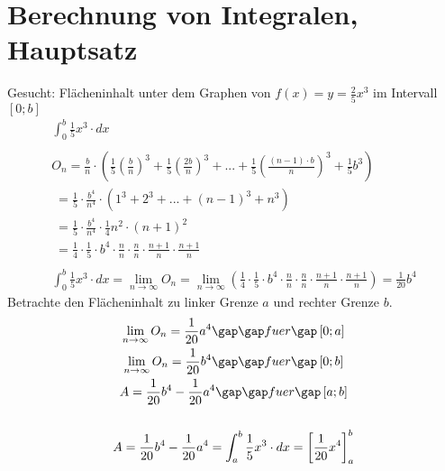 \section{Berechnung von Integralen, Hauptsatz}
Gesucht: Flächeninhalt unter dem Graphen von $f(x) = y = \frac{2}{5}x^3$ im Intervall $\left[0; b\right]$ \\
\begin{gather*}
  \int_0^b \frac{1}{5}x^3 \cdot dx \\\\
  O_n = \frac{b}{n} \cdot (\frac{1}{5}(\frac{b}{n})^3 + \frac{1}{5}(\frac{2b}{n})^3 + ... + \frac{1}{5}(\frac{(n - 1) \cdot b}{n})^3 + \frac{1}{5}b^3) \\
  \;= \frac{1}{5} \cdot \frac{b^4}{n^4} \cdot (1^3 + 2^3 + ... + (n - 1)^3 + n^3) \\
  \;= \frac{1}{5} \cdot \frac{b^4}{n^4} \cdot \frac{1}{4}n^2 \cdot (n + 1)^2 \\
  \;= \frac{1}{4} \cdot \frac{1}{5} \cdot b^4 \cdot \frac{n}{n} \cdot \frac{n}{n} \cdot \frac{n + 1}{n} \cdot \frac{n + 1}{n} \\\\
  \int_0^b \frac{1}{5}x^3 \cdot dx = \lim\limits_{n \to \infty} O_n = \lim\limits_{n \to \infty} (\frac{1}{4} \cdot \frac{1}{5} \cdot b^4 \cdot \frac{n}{n} \cdot \frac{n}{n} \cdot \frac{n + 1}{n} \cdot \frac{n + 1}{n}) = \frac{1}{20}b^4
\end{gather*}
Betrachte den Flächeninhalt zu linker Grenze $a$ und rechter Grenze $b$.
\begin{gather*}
  \lim\limits_{n \to \infty} O_n = \frac{1}{20}a^4 \gap\gap fuer\gap \left[0; a\right] \\
  \lim\limits_{n \to \infty} O_n = \frac{1}{20}b^4 \gap\gap fuer\gap \left[0; b\right] \\
  A = \frac{1}{20}b^4 - \frac{1}{20}a^4 \gap\gap fuer\gap \left[a; b\right] \\\\
  A = \frac{1}{20}b^4 - \frac{1}{20}a^4 = \int_a^b \frac{1}{5}x^3 \cdot dx = \left[\frac{1}{20}x^4\right]_a^b
\end{gather*}
